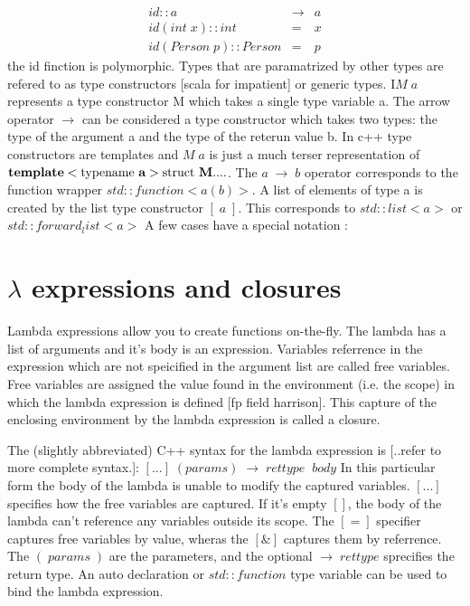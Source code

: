 \documentclass[12pt,fleqn]{article}
\begin{document}
\begin{eqnarray*}
id :: a &\rightarrow& a \\
id (int \; x)::int  &=& x  \\
id (Person \; p)::Person &=& p 
\end{eqnarray*}
the id finction is polymorphic.
Types that are paramatrized by other types are refered to as type constructors [scala for impatient] or generic types.
I$M\;a$ represents a type constructor  M which takes a single type variable a.
The arrow operator $\rightarrow$ can be considered a type constructor which takes two types: the type of the argument a and the type of the reterun value b.
In c++ type constructors are templates and $M\;a$ is just a much terser representation of 
$ {\bf template}<\mbox{typename {\bf a}}> \mbox{struct {\bf M}} {....}$. The $a\; \rightarrow\; b$ operator corresponds to the function wrapper $std::function<a(b)>$. A list of elements of type a is created by the list type constructor $[\;a\;]$. 
This corresponds to $std::list<a>$ or $std::forward_list<a>$
A few cases have a special notation :

 


\section*{$\lambda$ expressions and closures}

Lambda expressions allow you to create functions on-the-fly. 
The lambda has a list of arguments and it's body is an expression. 
Variables referrence in the expression which are not speicified in the argument list are called free variables. 
Free variables are assigned the value found in the environment (i.e. the scope) in which the lambda expression is defined [fp field harrison]. 
This capture of the enclosing environment by the lambda expression is called a closure. 

The (slightly abbreviated) C++ syntax for the lambda expression is [..refer to more complete syntax.]:
$
[...] \;  (params) \;  \rightarrow \; rettype \;\; { body }
$
In this particular form the body of the lambda is unable to modify the captured variables. 
$[...]$ specifies how the free variables are captured. If it's empty $[]$, the body of the lambda can't reference any variables outside its scope. 
The $[=]$ specifier captures free variables by value, wheras the $[\&]$ captures them by referrence. 
The $(\; params\;)$ are the parameters, and the optional $\rightarrow \; rettype$ sprecifies the return type. 
An auto declaration or $std::function$ type variable can be used to bind the lambda expression. 
\end{document}
